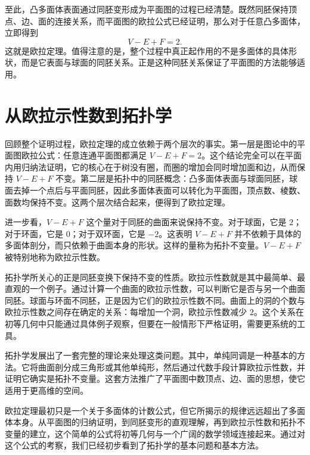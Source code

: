 \documentclass[12pt,UTF8,fontset=none]{ctexbook}
\begin{document}
至此，凸多面体表面通过同胚变形成为平面图的过程已经清楚。既然同胚保持顶点、边、面的连接关系，而平面图的欧拉公式已经证明，那么对于任意凸多面体，立即得到
\[
V-E+F=2.
\]
这就是欧拉定理。值得注意的是，整个过程中真正起作用的不是多面体的具体形状，而是它表面与球面的同胚关系。正是这种同胚关系保证了平面图的方法能够适用。


\section{从欧拉示性数到拓扑学}

回顾整个证明过程，欧拉定理的成立依赖于两个层次的事实。第一层是图论中的平面图欧拉公式：任意连通平面图都满足 $V-E+F=2$。这个结论完全可以在平面内用归纳法证明，它的核心在于树没有圈，而圈的增加会同时增加面和边，从而保持 $V-E+F$ 不变。第二层是拓扑中的同胚概念：凸多面体表面与球面同胚，球面去掉一个点后与平面同胚，因此多面体表面可以转化为平面图，顶点数、棱数、面数均保持不变。这两个层次结合起来，便得到了欧拉定理。

进一步看，$V-E+F$ 这个量对于同胚的曲面来说保持不变。对于球面，它是 $2$；对于环面，它是 $0$；对于双环面，它是 $-2$。这表明 $V-E+F$ 并不依赖于具体的多面体剖分，而只依赖于曲面本身的形状。这样的量称为拓扑不变量。$V-E+F$ 被特别地称为欧拉示性数。

拓扑学所关心的正是同胚变换下保持不变的性质。欧拉示性数就是其中最简单、最直观的一个例子。通过计算一个曲面的欧拉示性数，可以判断它是否与另一个曲面同胚。球面与环面不同胚，正是因为它们的欧拉示性数不同。曲面上的洞的个数与欧拉示性数之间存在确定的关系：每增加一个洞，欧拉示性数减少 $2$。这个关系在初等几何中只能通过具体例子观察，但要在一般情形下严格证明，需要更系统的工具。

拓扑学发展出了一套完整的理论来处理这类问题。其中，单纯同调是一种基本的方法。它将曲面剖分成三角形或其他单纯形，然后通过代数手段计算欧拉示性数，并证明它确实是拓扑不变量。这套方法推广了平面图中数顶点、边、面的思想，使它适用于更高维的空间。

欧拉定理最初只是一个关于多面体的计数公式，但它所揭示的规律远远超出了多面体本身。从平面图的归纳证明，到同胚变形的直观理解，再到欧拉示性数和拓扑不变量的建立，这个简单的公式将初等几何与一个广阔的数学领域连接起来。通过对这个公式的考察，我们已经初步看到了拓扑学的基本问题和基本方法。
\end{document}
